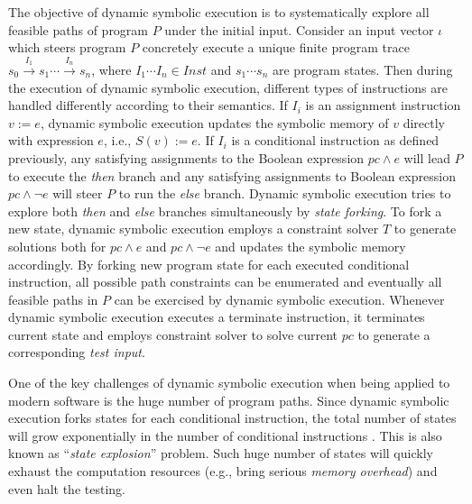 The objective of dynamic symbolic execution is to systematically explore all feasible paths of program $P$ under the initial input.
 Consider an input vector $\iota$ which steers program $P$ concretely execute a unique finite program trace $s_0\xrightarrow{I_1}s_1\cdots\xrightarrow{I_n}s_n$, where $I_1\cdots I_n\in Inst$ and $s_1\cdots s_n$ are program states.
 Then during the execution of dynamic symbolic execution, different types of instructions are handled differently according to their semantics.
 If $I_i$ is an assignment instruction $v:=e$, dynamic symbolic execution updates the symbolic memory of $v$ directly with expression $e$, i.e., $S(v):= e$. 
 If $I_i$ is a conditional instruction as defined previously, any satisfying assignments to the Boolean expression $pc\wedge e$ will lead $P$ to execute the \textit{then} branch and any satisfying assignments to Boolean expression $pc\wedge\neg e$ will steer $P$ to run the \textit{else} branch. 
 Dynamic symbolic execution tries to explore both \textit{then} and \textit{else} branches simultaneously by \textit{state forking}.
 To fork a new state, dynamic symbolic execution employs a constraint solver $T$ to generate solutions both for $pc\wedge e$ and $pc\wedge\neg e$ and updates the symbolic memory accordingly.
 By forking new program state for each executed conditional instruction, all possible path constraints can be enumerated and eventually all feasible paths in $P$ can be exercised by dynamic symbolic execution.
 Whenever dynamic symbolic execution executes a terminate instruction, it terminates current state and employs constraint solver to solve current $pc$ to generate a corresponding \textit{test input}.

One of the key challenges of dynamic symbolic execution when being applied to modern software is the huge number of program paths.
 Since dynamic symbolic execution forks states for each conditional instruction, the total number of states will grow exponentially in the number of conditional instructions \cite{cadar2013symbolic}.
 This is also known as ``\textit{state explosion}'' problem.
 Such huge number of states will quickly exhaust the computation resources (e.g., bring serious \textit{memory overhead}) and even halt the testing.



